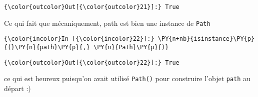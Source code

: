 \begin{Verbatim}[commandchars=\\\{\}]
{\color{outcolor}Out[{\color{outcolor}21}]:} True
\end{Verbatim}
            
    Ce qui fait que mécaniquement, path est bien une instance de
\texttt{Path}

    \begin{Verbatim}[commandchars=\\\{\}]
{\color{incolor}In [{\color{incolor}22}]:} \PY{n+nb}{isinstance}\PY{p}{(}\PY{n}{path}\PY{p}{,} \PY{n}{Path}\PY{p}{)}
\end{Verbatim}


\begin{Verbatim}[commandchars=\\\{\}]
{\color{outcolor}Out[{\color{outcolor}22}]:} True
\end{Verbatim}
            
    ce qui est heureux puisqu'on avait utilisé \texttt{Path()} pour
construire l'objet \texttt{path} au départ :)


    
    
    
